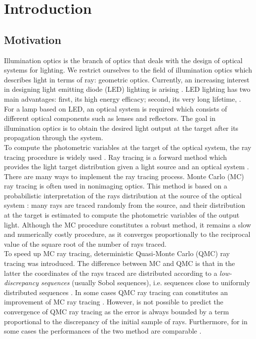 \chapter{Introduction}
\section{Motivation}
Illumination optics is the branch of optics that deals with the design of optical systems for lighting. We restrict ourselves to the field of illumination optics which describes light in terms of ray: geometric optics. 
Currently, an increasing interest in designing light emitting
diode (LED) lighting is arising \cite{moreno2008modeling}. LED lighting has two main
advantages: first, its high energy efficacy; second, its very long lifetime, \cite{taguchi2008present, haitz2011solid}. For a lamp based on LED, an optical system is required
which consists of different optical components such
as lenses and reflectors. The goal in illumination optics is to
obtain the desired light output at the target after its propagation through the system.
\\ \indent To compute the photometric variables at the target of the
optical system, the ray tracing procedure is widely used \cite{glassner1989introduction}.
Ray tracing is a forward method which provides the light target distribution given a light source and an optical system \cite{Gross2005Handbook}. There are many ways to implement the ray tracing
process. Monte Carlo (MC) ray tracing is often used in nonimaging
optics. This method is based on a probabilistic interpretation
of the rays distribution at the source of the optical
system \cite{liu2010precise,Ting:1}: many rays are traced randomly from the source,
and their distribution at the target is estimated to compute the
photometric variables of the output light. Although the MC
procedure constitutes a robust method, it remains a slow and
numerically costly procedure, as it converges proportionally
to the reciprocal value of the square root of the number of rays
traced. \\ \indent To speed up MC ray tracing, deterministic Quasi-Monte Carlo (QMC) ray tracing was introduced. The difference between MC and QMC is that in the latter the coordinates of the rays traced are distributed according to a \textit{low-discrepancy sequences} (usually Sobol sequences), i.e. sequences close to uniformly distributed sequences \cite{levy2002introduction}. 
In some cases QMC ray tracing can constitutes an improvement of MC ray tracing \cite{ohbuchi1996quasi, caflisch1998monte}. However, is not possible to predict the convergence of QMC ray tracing as the error is always bounded by a term proportional to the discrepancy of the initial sample of rays. Furthermore, for in some cases the performances of the two method are comparable \cite{tuffin2004randomization}. 

